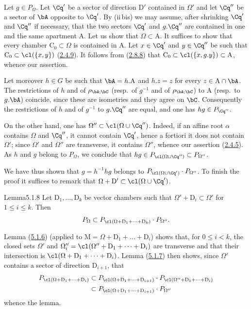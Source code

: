 \documentclass[12pt,a4paper,oneside,english]{smfart}
\makeatletter
\newcommand{\btanchor}[1]{\leavevmode\Hy@raisedlink{\hypertarget{bt:#1}{}}}
\newcommand{\btpageanchor}[1]{\Hy@raisedlink{\hypertarget{p:#1}{}}}
\newcommand{\btref}[1]{\hyperlink{bt:#1}{#1}}
\newcommand{\btpage}[1]{\marginnote{p.~#1}\btpageanchor{#1}}
\newcommand{\pg}[1]{\btpage{#1}}
\theoremstyle{definition}
\theoremstyle{bt}
\makeatother
\begin{document}
\providecommand{\btpar}{}
\renewcommand{\btpar}[1]{\par\medskip\noindent\textbf{(#1)}\ }
\bigskip
\pg{85}
\noindent
Let $g\in P_{\Omega}$. Let $\Cq'$ be a sector of direction $\mathrm{D}'$
contained in $\Omega'$ and let $\Cq''$ be a sector of $\bA$ opposite to
$\Cq'$. By (ii\,bis) we may assume, after shrinking $\Cq'$ and $\Cq''$ if
necessary, that the two sectors $\Cq'$ and $g.\Cq''$ are contained in one and
the same apartment $\mathrm{A}$. Let us show that $\Omega\subset \mathrm{A}$.
It suffices to show that every chamber $\mathrm{C}_{0}\subset\Omega$ is
contained in $\mathrm{A}$. Let $x\in\Cq'$ and $y\in\Cq''$ be such that
$\mathrm{C}_{0}\subset\cl(\{x,y\})$ (\btref{2.4.9}). It follows from (\btref{2.8.8}) that
$\mathrm{C}_{0}\subset\cl(\{x,g.y\})\subset \mathrm{A}$, whence our assertion.

Let moreover $h\in G$ be such that $\bA=h.\mathrm{A}$ and $h.z=z$ for every
$z\in \mathrm{A}\cap\bA$. The restrictions of $h$ and of $\rho_{\bA;\bC}$
(resp.\ of $g^{-1}$ and of $\rho_{\bA;\bC}$) to $\mathrm{A}$ (resp.\ to
$g.\bA$) coincide, since these are isometries and they agree on $\bC$.
Consequently the restrictions of $h$ and of $g^{-1}$ to $g.\Cq''$ are equal,
and one has $hg\in P_{\Cq''}$.

On the other hand, one has $\Omega''\subset\cl(\Omega\cup\Cq'')$. Indeed, if an
affine root $\alpha$ contains $\Omega$ and $\Cq''$, it cannot contain $\Cq'$,
hence a fortiori it does not contain $\Omega'$; since $\Omega'$ and $\Omega''$
are transverse, it contains $\Omega''$, whence our assertion (\btref{2.4.5}). As $h$
and $g$ belong to $P_{\Omega}$, we conclude that
$hg\in P_{\cl(\Omega\cup\Cq'')}\subset P_{\Omega''}$.

We have thus shown that $g=h^{-1}hg$ belongs to
$P_{\cl(\Omega\cup\Cq')}\cdot P_{\Omega''}$. To finish the proof it suffices to
remark that $\Omega+\mathrm{D}'\subset\cl(\Omega\cup\Cq')$.

\begin{btstat}{Lemma}{5.1.8}\btanchor{5.1.8}
Let $\mathrm{D}_{1},\dots,\mathrm{D}_{k}$ be vector chambers such that
$\Omega'+\mathrm{D}_{i}\subset\Omega'$ for $1\leqslant i\leqslant k$. Then
\[
P_{\Omega}\subset P_{\cl(\Omega+\mathrm{D}_{1}+\dots+\mathrm{D}_{k})}\cdot P_{\Omega''}.
\]
\end{btstat}

Lemma (\btref{5.1.6}) (applied to $\mathrm{M}=\Omega+\mathrm{D}_{1}+\dots+\mathrm{D}_{i}$)
shows that, for $0\leqslant i<k$, the closed sets $\Omega'$ and
$\Omega''_{i}=\cl(\Omega''+\mathrm{D}_{1}+\dots+\mathrm{D}_{i})$ are transverse
and that their intersection is
$\cl(\Omega+\mathrm{D}_{1}+\dots+\mathrm{D}_{i})$. Lemma (\btref{5.1.7}) then shows,
since $\Omega'$ contains a sector of direction $\mathrm{D}_{i+1}$, that
\begin{align*}
P_{\cl(\Omega+\mathrm{D}_{1}+\dots+\mathrm{D}_{i})}
&\subset P_{\cl(\Omega+\mathrm{D}_{1}+\dots+\mathrm{D}_{i+1})}\cdot
   P_{\cl(\Omega''+\mathrm{D}_{1}+\dots+\mathrm{D}_{i})}\\
&\subset P_{\cl(\Omega+\mathrm{D}_{1}+\dots+\mathrm{D}_{i+1})}\cdot P_{\Omega''}
\end{align*}
whence the lemma.
\end{document}
